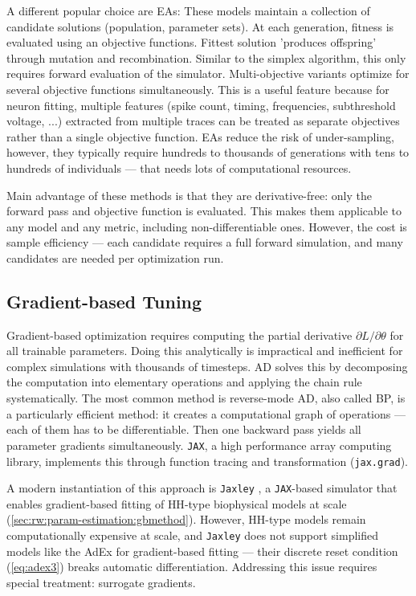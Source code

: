 A different popular choice are \glspl{EA}:
These models maintain a collection of candidate solutions (population, parameter sets).
At each generation, fitness is evaluated using an objective functions.
Fittest solution 'produces offspring' through mutation and recombination.
Similar to the simplex algorithm, this only requires forward evaluation of the simulator.
Multi-objective variants optimize for several objective functions simultaneously.
This is a useful feature because for neuron fitting, multiple features (spike count, timing, frequencies, subthreshold voltage, ...) extracted from multiple traces can be treated as separate objectives rather than a single objective function.
\glspl{EA} reduce the risk of under-sampling, however, they typically require hundreds to thousands of generations with tens to hundreds of individuals --- that needs lots of computational resources.

Main advantage of these methods is that they are derivative-free: only the forward pass and objective function is evaluated.
This makes them applicable to any model and any metric, including non-differentiable ones.
However, the cost is sample efficiency — each candidate requires a full forward simulation, and many candidates are needed per optimization run.

\subsection{Gradient-based Tuning}\label{sec:bg:tuning:gradient-based}
Gradient-based optimization requires computing the partial derivative $\partial L / \partial \theta$ for all trainable parameters.
Doing this analytically is impractical and inefficient for complex simulations with thousands of timesteps.
\gls{AD} solves this by decomposing the computation into elementary operations and applying the chain rule systematically.
The most common method is reverse-mode \gls{AD}, also called \gls{BP}, is a particularly efficient method:
it creates a computational graph of operations --- each of them has to be differentiable.
Then one backward pass yields all parameter gradients simultaneously.
\texttt{JAX}, a high performance array computing library, implements this through function tracing and transformation (\verb|jax.grad|).

A modern instantiation of this approach is \texttt{Jaxley} \cite{Deistler2025}, a \texttt{JAX}-based simulator that enables gradient-based fitting of \gls{HH}-type biophysical models at scale (\cref{sec:rw:param-estimation:gbmethod}).
However, \gls{HH}-type models remain computationally expensive at scale, and \texttt{Jaxley} does not support simplified models like the \gls{AdEx} for gradient-based fitting --- their discrete reset condition (\cref{eq:adex3}) breaks automatic differentiation.
Addressing this issue requires special treatment: surrogate gradients.


